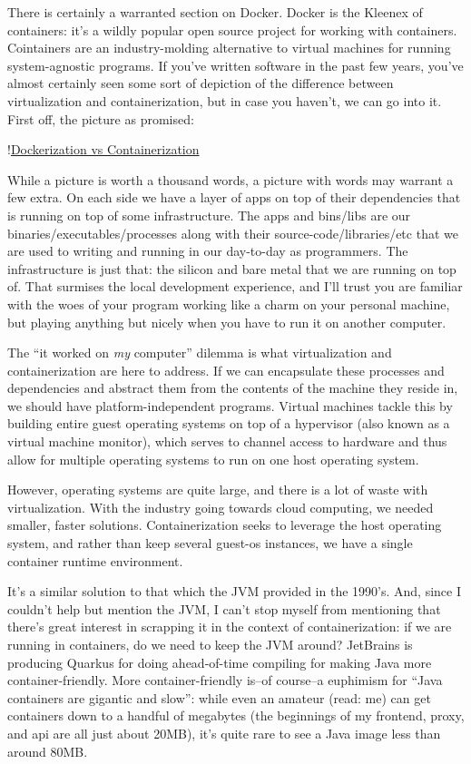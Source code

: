 \documentclass[11pt, twoside, reqno]{book}
\begin{document}
There is certainly a warranted section on Docker. Docker is the Kleenex of containers: it's a wildly popular open source project for working with containers. Cointainers are an industry-molding alternative to virtual machines for running system-agnostic programs. If you've written software in the past few years, you've almost certainly seen some sort of depiction of the difference between virtualization and containerization, but in case you haven't, we can go into it. First off, the picture as promised:

!\href{https://blog.netapp.com/wp-content/uploads/2016/03/Screen-Shot-2018-03-20-at-9.24.09-AM-1024x548.png}{Dockerization vs Containerization}

While a picture is worth a thousand words, a picture with words may warrant a few extra. On each side we have a layer of apps on top of their dependencies that is running on top of some infrastructure. The apps and bins/libs are our binaries/executables/processes along with their source-code/libraries/etc that we are used to writing and running in our day-to-day as programmers. The infrastructure is just that: the silicon and bare metal that we are running on top of. That surmises the local development experience, and I'll trust you are familiar with the woes of your program working like a charm on your personal machine, but playing anything but nicely when you have to run it on another computer.

The ``it worked on \textit{my} computer'' dilemma is what virtualization and containerization are here to address. If we can encapsulate these processes and dependencies and abstract them from the contents of the machine they reside in, we should have platform-independent programs. Virtual machines tackle this by building entire guest operating systems on top of a hypervisor (also known as a virtual machine monitor), which serves to channel access to hardware and thus allow for multiple operating systems to run on one host operating system.

However, operating systems are quite large, and there is a lot of waste with virtualization. With the industry going towards cloud computing, we needed smaller, faster solutions. Containerization seeks to leverage the host operating system, and rather than keep several guest-os instances, we have a single container runtime environment.

It's a similar solution to that which the JVM provided in the 1990's. And, since I couldn't help but mention the JVM, I can't stop myself from mentioning that there's great interest in scrapping it in the context of containerization: if we are running in containers, do we need to keep the JVM around? JetBrains is producing Quarkus for doing ahead-of-time compiling for making Java more container-friendly. More container-friendly is--of course--a euphimism for ``Java containers are gigantic and slow'': while even an amateur (read: me) can get containers down to a handful of megabytes (the beginnings of my frontend, proxy, and api are all just about 20MB), it's quite rare to see a Java image less than around 80MB.
\end{document}
